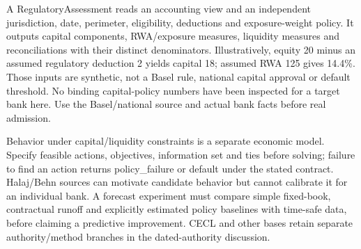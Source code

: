 A RegulatoryAssessment reads an accounting view and an independent jurisdiction, date, perimeter, eligibility, deductions and exposure-weight policy. It outputs capital components, RWA/exposure measures, liquidity measures and reconciliations with their distinct denominators. Illustratively, equity 20 minus an assumed regulatory deduction 2 yields capital 18; assumed RWA 125 gives 14.4\%. Those inputs are synthetic, not a Basel rule, national capital approval or default threshold. No binding capital-policy numbers have been inspected for a target bank here. Use the Basel/national source and actual bank facts before real admission.

Behavior under capital/liquidity constraints is a separate economic model. Specify feasible actions, objectives, information set and ties before solving; failure to find an action returns policy\_failure or default under the stated contract. Halaj/Behn sources can motivate candidate behavior but cannot calibrate it for an individual bank. A forecast experiment must compare simple fixed-book, contractual runoff and explicitly estimated policy baselines with time-safe data, before claiming a predictive improvement. CECL and other bases retain separate authority/method branches in the dated-authority discussion.
